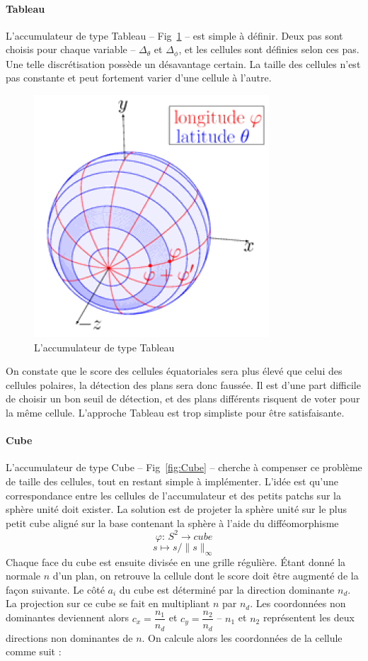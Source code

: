 ﻿\documentclass[12pt, twoside]{article}
\begin{document}
\paragraph{Tableau}
L’accumulateur de type Tableau -- Fig~\ref{fig:Array} -- est simple à définir. Deux pas sont choisis pour chaque variable -- $\Delta_{\theta}$ et $\Delta_{\phi}$, et les cellules sont définies selon ces pas. Une telle discrétisation possède un désavantage certain. La taille des cellules n’est pas constante et peut fortement varier d’une cellule à l’autre.

\begin{figure}[h]
\centering
\includegraphics[scale=0.65]{Array.png}
\caption{\label{fig:Array} L'accumulateur de type Tableau}
\end{figure}

On constate que le score des cellules équatoriales sera plus élevé que celui des cellules polaires, la détection des plans sera donc faussée. Il est d’une part difficile de choisir un bon seuil de détection, et des plans différents risquent de voter pour la même cellule. L’approche Tableau est trop simpliste pour être satisfaisante.

\paragraph{Cube}
L’accumulateur de type Cube -- Fig~\ref{fig:Cube} -- cherche à compenser ce problème de taille des cellules, tout en restant simple à implémenter. L’idée est qu’une correspondance entre les cellules de l’accumulateur et des petits patchs sur la sphère unité doit exister. La solution est de projeter la sphère unité sur le plus petit cube aligné sur la base contenant la sphère à l’aide du difféomorphisme
$$\varphi \text{: } S^2 \rightarrow cube$$
$$s \mapsto s/\lVert s\rVert_{\infty}$$
Chaque face du cube est ensuite divisée en une grille régulière. Étant donné la normale $n$ d’un plan, on retrouve la cellule dont le score doit être augmenté de la façon suivante. Le côté $a_i$ du cube est déterminé par la direction dominante $n_d$. La projection sur ce cube se fait en multipliant $n$ par $n_d$. Les coordonnées non dominantes deviennent alors $c_x =
\dfrac{n_1}{n_d}$ et $c_y = \dfrac{n_2}{n_d}$ -- $n_1$ et $n_2$ représentent les deux directions non dominantes de $n$. On calcule alors les coordonnées de la cellule comme suit :
\end{document}
